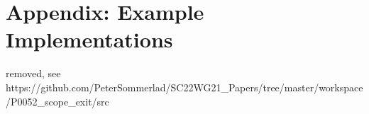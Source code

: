 \documentclass[ebook,11pt,article]{memoir}
\begin{document}
\newpage
\chapter{Appendix: Example Implementations}
removed, see \\
https://github.com/PeterSommerlad/SC22WG21_Papers/tree/master/workspace/P0052_scope_exit/src
\end{document}
